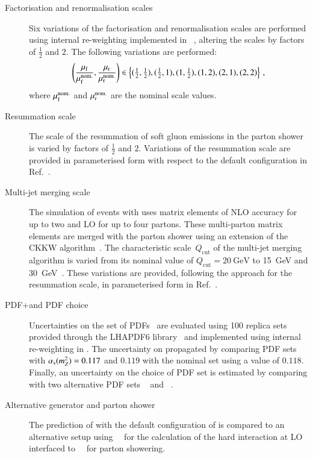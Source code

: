 \begin{description}

\item[Factorisation and renormalisation scales] Six variations of the
  factorisation and renormalisation scales are performed using internal
  re-weighting implemented in \SHERPA[2.2.1]~\cite{Bothmann:2019yzt}, altering
  the scales by factors of $\frac{1}{2}$ and $2$. The following variations are
  performed:
  \begin{align*}
    \left( \frac{\mu_\mathrm{f}}{\mu_\mathrm{f}^{\text{nom.}}}, \frac{\mu_\mathrm{r}}{\mu_\mathrm{r}^{\text{nom.}}} \right) \in
    \left\{ (\tfrac{1}{2}, \tfrac{1}{2}), (\tfrac{1}{2}, 1), (1, \tfrac{1}{2}), (1, 2), (2, 1), (2, 2) \right\} \,\text{,}
  \end{align*}
  where $\mu_\mathrm{f}^{\text{nom.}}$ and $\mu_\mathrm{r}^{\text{nom.}}$ are the nominal scale
  values.

\item[Resummation scale] The scale of the resummation of soft gluon emissions in
  the \SHERPA parton shower is varied by factors of $\frac{1}{2}$ and
  $2$. Variations of the resummation scale are provided in parameterised form
  with respect to the default \SHERPA configuration in Ref.~\cite{anders:2017}.

\item[Multi-jet merging scale] The simulation of \Zjets events with
  \SHERPA[2.2.1] uses matrix elements of NLO accuracy for up to two and LO for
  up to four partons. These multi-parton matrix elements are merged with the
  parton shower using an extension of the CKKW
  algorithm~\cite{Catani:2001cc,Hoeche:2009rj,Hoeche:2012yf}. The characteristic
  scale~$Q_{\text{cut}}$ of the multi-jet merging algorithm is varied from its
  nominal value of $Q_{\text{cut}} = \SI{20}{\GeV}$ to \SI{15}{\GeV} and
  \SI{30}{\GeV}~\cite{anders:2017}. These variations are provided, following the
  approach for the resummation scale, in parameterised form in
  Ref.~\cite{anders:2017}.

\item[PDF+\alphas and PDF choice] Uncertainties on the \NNPDF[3.0nnlo] set of
  PDFs~\cite{Ball:2014uwa} are evaluated using 100 replica sets provided through
  the \textsc{LHAPDF6} library~\cite{Buckley:2014ana} and implemented using
  internal re-weighting in \SHERPA. The uncertainty on \alphas propagated by
  comparing \NNPDF[3.0nnlo] PDF sets with $\alpha_{\text{s}}(m_{Z}^2) = 0.117$ and $0.119$
  with the nominal set using a value of $0.118$. Finally, an uncertainty on the
  choice of PDF set is estimated by comparing with two alternative PDF sets
  \MMHT[nnlo68cl]~\cite{Harland-Lang:2014zoa} and
  \CT[14nnlo]~\cite{Dulat:2015mca}.

\item[Alternative generator and parton shower] The prediction of \Zjets with the
  default configuration of \SHERPA[2.2.1] is compared to an alternative setup
  using~\MGNLO[2.2.2]~\cite{Alwall:2014hca} for the calculation of the hard
  interaction at LO interfaced to~\PYTHIA[8.186]~\cite{Sjostrand:2007gs} for
  parton showering.

\end{description}


